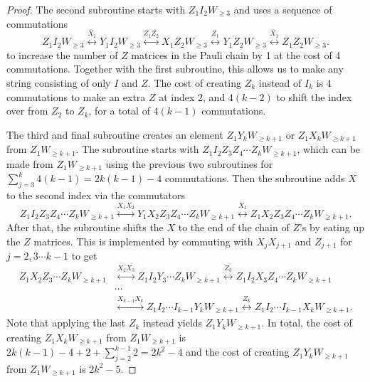 \documentclass[10pt,a4paper]{amsart}
\begin{document}
\begin{proof}
The second subroutine starts with $Z_1 I_2 W_{\geq 3}$ and uses a sequence of commutations
\begin{equation}
    Z_1 I_2 W_{\geq 3} \stackrel{X_1}{\longleftrightarrow} Y_1 I_2 W_{\ge 3} \stackrel{Z_1 Z_2}{\longleftrightarrow} X_1 Z_2 W_{\ge 3} \stackrel{Z_1}{\longleftrightarrow}Y_1 Z_2 W_{\ge 3} \stackrel{X_1}{\longleftrightarrow} Z_1 Z_2 W_{\geq 3}.
\end{equation}
to increase the number of $Z$ matrices in the Pauli chain by 1 at the cost of 4 commutations. Together with the first subroutine, this allows us to make any string consisting of only $I$ and $Z$. The cost of creating $Z_k$ instead of $I_k$ is 4 commutations to make an extra $Z$ at index 2, and $4(k-2)$ to shift the index over from $Z_2$ to $Z_k$, for a total of $4(k-1)$ commutations.

The third and final subroutine creates an element $Z_1 Y_k W_{\geq k+1}$ or $Z_1 X_k W_{\geq k+1}$ from $Z_1 W_{\geq k+1}$. 
The subroutine starts with $Z_1 I_2 Z_3 Z_4 \cdots Z_k W_{\geq k+1}$, which can be made from $Z_1 W_{\geq k+1}$ using the previous two subroutines for $\sum_{j=3}^k 4(k-1) = 2k(k-1)-4$ commutations. Then the subroutine adds $X$ to the second index via the commutators
\begin{equation}
    Z_1 I_2 Z_3 Z_4 \cdots Z_k W_{\geq k+1} \stackrel{X_1 X_2}{\longleftrightarrow} Y_1 X_2 Z_3 Z_4 \cdots Z_k W_{\geq k+1} \stackrel{X_1}{\longleftrightarrow} Z_1 X_2 Z_3 Z_4 \cdots Z_k W_{\geq k+1}.
\end{equation}
After that, the subroutine shifts the $X$ to the end of the chain of $Z$'s by eating up the $Z$ matrices. This is implemented by commuting with $X_j X_{j+1}$ and $Z_{j+1}$ for $j = 2, 3 \cdots k-1$ to get
\begin{equation}
\begin{aligned}
        Z_1 X_2 Z_3 \cdots Z_kW_{\geq k+1}  &\stackrel{X_2 X_3}{\longleftrightarrow} Z_1 I_2 Y_3 \cdots Z_kW_{\geq k+1}  \stackrel{Z_3}{\longleftrightarrow} Z_1 I_2 X_3 Z_4 \cdots Z_kW_{\geq k+1} \\
        &\cdots  \\
        &\stackrel{X_{k-1} X_k}{\longleftrightarrow} Z_1 I_2 \cdots I_{k-1} Y_k W_{\geq k+1} \stackrel{Z_k}{\longleftrightarrow} Z_1 I_2 \cdots I_{k-1} X_k W_{\geq k+1}. 
\end{aligned}
\end{equation}
Note that applying the last $Z_k$ instead yields  $Z_1 Y_k W_{\geq k+1}$. In total, the cost of creating $Z_1 X_k W_{\geq k+1}$ from $Z_1 W_{\geq k+1}$ is $2k(k-1) - 4 + 2 + \sum_{j=2}^{k-1} 2 = 2k^2-4$ and the cost of creating $Z_1 Y_k W_{\geq k+1}$ from $Z_1 W_{\geq k+1}$ is $2k^2-5$.


\end{proof}
\end{document}
